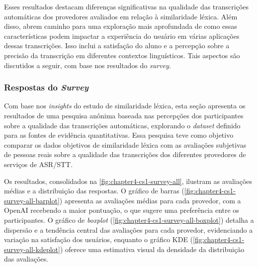 Esses resultados destacam diferenças significativas na qualidade das transcrições automáticas dos provedores avaliados em relação à similaridade léxica. Além disso, abrem caminho para uma exploração mais aprofundada de como essas características podem impactar a experiência do usuário em várias aplicações dessas transcrições. Isso inclui a satisfação do aluno e a percepção sobre a precisão da transcrição em diferentes contextos linguísticos. Tais aspectos são discutidos a seguir, com base nos resultados do \textit{survey}.

\subsubsection{Respostas do \textit{Survey}}

Com base nos \textit{insights} do estudo de similaridade léxica, esta seção apresenta os resultados de uma pesquisa anônima baseada nas percepções dos participantes sobre a qualidade das transcrições automáticas, explorando o \textit{dataset} definido para as fontes de evidência quantitativas. Essa pesquisa teve como objetivo comparar os dados objetivos de similaridade léxica com as avaliações subjetivas de pessoas reais sobre a qualidade das transcrições dos diferentes provedores de serviços de ASR/STT.

Os resultados, consolidados na \autoref{fig:chapter4-cs1-survey-all}, ilustram as avaliações médias e a distribuição das respostas. O gráfico de barras (\autoref{fig:chapter4-cs1-survey-all-barplot}) apresenta as avaliações médias para cada provedor, com a OpenAI recebendo a maior pontuação, o que sugere uma preferência entre os participantes. O gráfico de \textit{boxplot} (\autoref{fig:chapter4-cs1-survey-all-boxplot}) detalha a dispersão e a tendência central das avaliações para cada provedor, evidenciando a variação na satisfação dos usuários, enquanto o gráfico KDE (\autoref{fig:chapter4-cs1-survey-all-kdeplot}) oferece uma estimativa visual da densidade da distribuição das avaliações.

